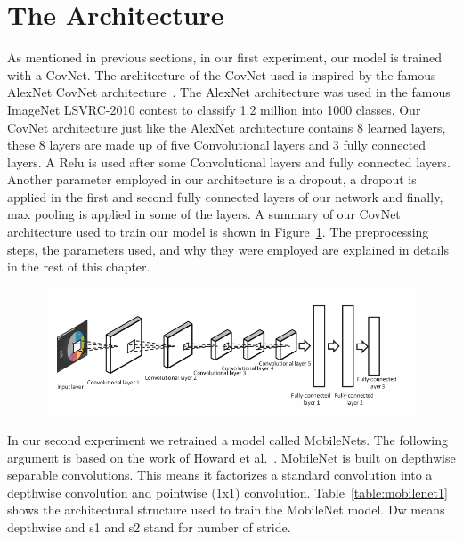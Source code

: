 \documentclass[12pt, a4paper,oneside]{report}
\begin{document}
\section{The Architecture}
As mentioned in previous sections, in our first experiment, our model is trained with a CovNet. The architecture of the CovNet used is inspired by the famous AlexNet CovNet architecture~\cite{krizhevsky2012imagenet}. The AlexNet architecture was used in the famous ImageNet LSVRC-2010 contest to classify 1.2 million into 1000 classes. Our CovNet architecture just like the AlexNet architecture contains 8 learned layers, these 8 layers are made up of five Convolutional layers and 3 fully connected layers. A Relu is used after some Convolutional layers and fully connected layers. Another parameter employed in our architecture is a dropout, a dropout is applied in the first and second fully connected layers of our network and finally, max pooling is applied in some of the layers. A summary of our CovNet architecture used to train our model is shown in Figure~\ref{fig:archi}. The preprocessing steps, the parameters used, and why they were employed are explained in details in the rest of this chapter.

\begin{figure}[!htbp]
\centering
\includegraphics [scale= 0.5] {architectur.png}
\label{fig:archi}
\end{figure}

In our second experiment we retrained a model called MobileNets. The following argument is based on the work of Howard et al.~\cite{howard2017mobilenets}.
MobileNet is built on depthwise separable convolutions. This means it factorizes a standard convolution into a depthwise convolution and pointwise (1x1) convolution. Table~\ref{table:mobilenet1} shows the architectural structure used to train the MobileNet model. Dw means depthwise and s1 and s2 stand for number of stride.
\end{document}
